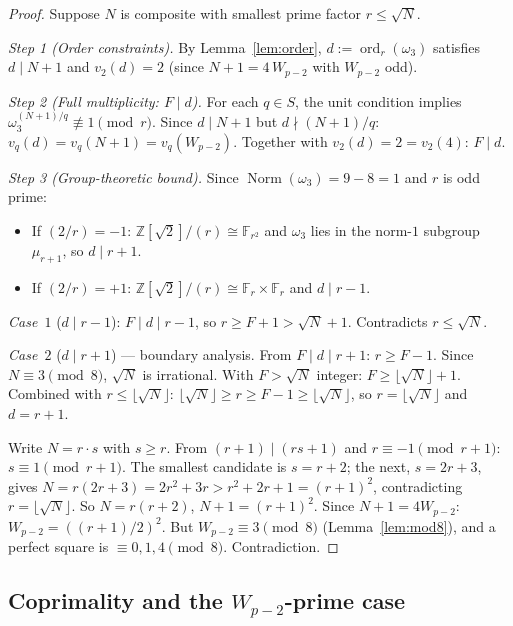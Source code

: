 \documentclass[11pt,a4paper]{amsart}
\theoremstyle{plain}
\theoremstyle{definition}
\DeclareMathOperator{\ord}{ord}
\DeclareMathOperator{\Norm}{Norm}
\newcommand{\Z}{\mathbb{Z}}
\newcommand{\F}{\mathbb{F}}
\newcommand{\wom}{\omega_3}
\newcommand{\sqrttwo}{\sqrt{2}}
\begin{document}
\begin{proof}
Suppose $N$ is composite with smallest prime factor $r \leq \sqrt N$.

\emph{Step 1 (Order constraints).}
By Lemma~\ref{lem:order}, $d := \ord_r(\wom)$ satisfies $d \mid N+1$
and $v_2(d) = 2$ (since $N + 1 = 4\,W_{p-2}$ with $W_{p-2}$ odd).

\emph{Step 2 (Full multiplicity: $F \mid d$).}
For each $q \in S$, the unit condition implies
$\wom^{(N+1)/q} \not\equiv 1 \pmod r$. Since $d \mid N+1$ but $d \nmid
(N+1)/q$: $v_q(d) = v_q(N+1) = v_q(W_{p-2})$. Together with
$v_2(d) = 2 = v_2(4)$: $F \mid d$.

\emph{Step 3 (Group-theoretic bound).}
Since $\Norm(\wom) = 9 - 8 = 1$ and $r$ is odd prime:
\begin{itemize}
\item If $(2/r) = -1$: $\Z[\sqrttwo]/(r) \cong \F_{r^2}$ and $\wom$
      lies in the norm-$1$ subgroup $\mu_{r+1}$, so $d \mid r + 1$.
\item If $(2/r) = +1$: $\Z[\sqrttwo]/(r) \cong \F_r \times \F_r$ and
      $d \mid r - 1$.
\end{itemize}

\emph{Case~$1$} ($d \mid r - 1$): $F \mid d \mid r-1$, so
$r \geq F + 1 > \sqrt N + 1$. Contradicts $r \leq \sqrt N$.

\emph{Case~$2$} ($d \mid r + 1$) --- boundary analysis.
From $F \mid d \mid r+1$: $r \geq F - 1$. Since $N \equiv 3 \pmod 8$,
$\sqrt N$ is irrational. With $F > \sqrt N$ integer: $F \geq \lfloor
\sqrt N \rfloor + 1$. Combined with $r \leq \lfloor \sqrt N \rfloor$:
$\lfloor \sqrt N \rfloor \geq r \geq F - 1 \geq \lfloor \sqrt N
\rfloor$, so $r = \lfloor \sqrt N \rfloor$ and $d = r + 1$.

Write $N = r \cdot s$ with $s \geq r$. From $(r+1) \mid (rs + 1)$ and
$r \equiv -1 \pmod{r+1}$: $s \equiv 1 \pmod{r+1}$. The smallest
candidate is $s = r + 2$; the next, $s = 2r + 3$, gives
$N = r(2r+3) = 2r^2 + 3r > r^2 + 2r + 1 = (r+1)^2$, contradicting
$r = \lfloor \sqrt N \rfloor$. So $N = r(r+2)$, $N + 1 = (r+1)^2$.
Since $N+1 = 4 W_{p-2}$: $W_{p-2} = ((r+1)/2)^2$. But $W_{p-2} \equiv
3 \pmod 8$ (Lemma~\ref{lem:mod8}), and a perfect square is $\equiv 0,
1, 4 \pmod 8$. Contradiction.
\end{proof}

\subsection{Coprimality and the $W_{p-2}$-prime case}
\end{document}
